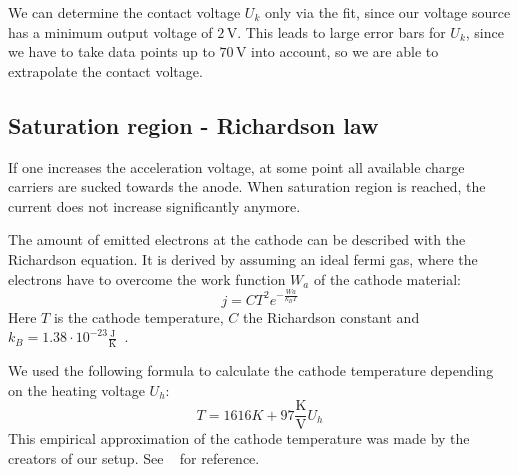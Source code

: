\documentclass[a4paper,10pt,twocolumn]{article}
\newcommand{\wolframWa}{4.55\, \mathrm{eV}}
\newcommand{\volt}{\, \mathrm{V}}
\newcommand{\minvoltage}{2 \volt}
\begin{document}
    We can determine the contact voltage $U_k$ only via the fit, since our voltage source has a minimum output voltage of $\minvoltage$.
    This leads to large error bars for $U_k$, since we have to take data points up to $70 \volt$ into account,
    so we are able to extrapolate the contact voltage.
    
    
    \subsection{Saturation region - Richardson law}
    
    
    If one increases the acceleration voltage, at some point all available charge carriers are sucked towards the anode.
    When saturation region is reached, the current does not increase significantly anymore.
    
    The amount of emitted electrons at the cathode can be described with the Richardson equation.
    It is derived by assuming an ideal fermi gas, where the electrons have to overcome the work function
    $W_a$ of the cathode material:
    \begin{equation}
        \label{eq:theoreticalRichardson}
        j = C T^2 e^{- \frac{Wa}{k_B T}}
    \end{equation}
    Here $T$ is the cathode temperature, $C$ the Richardson constant 
    and $k_B = 1.38 \cdot 10^{-23} \frac{\mathrm{J}}{\mathrm{K}} $~\cite{boltzmanSource}.
    
    We used the following formula to calculate the cathode temperature depending on the heating voltage $U_h$:
    \begin{equation}
        \label{eq:richardsonTemperature}
        T = 1616 K + 97 \frac{\mathrm{K}}{\mathrm{V}} U_h
    \end{equation}
    This empirical approximation of the cathode temperature was made by the creators of our setup.
    See ~\cite{instr} for reference.
    
\end{document}
